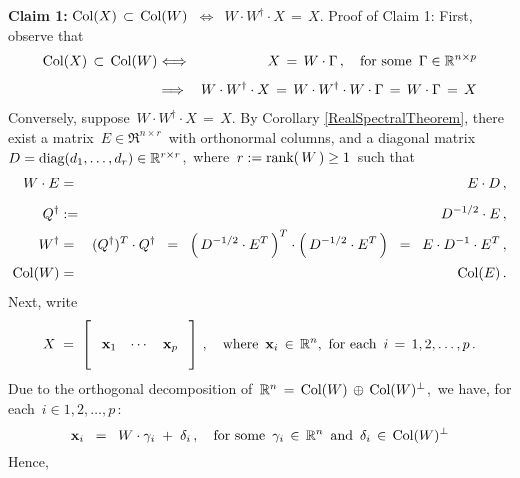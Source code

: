 \begin{enumerate}
	\vskip 0.5cm
	\noindent
	\textbf{Claim 1:}\quad
	$\Col(X) \,\subset\, \Col(W)$
	\,\;$\Longleftrightarrow$\,\; $W \cdot W^{\dagger} \cdot X \,=\,X$.
	\vskip 0.0cm
	\noindent
	Proof of Claim 1:\quad
	First, observe that
	\begin{eqnarray*}
	\Col(X) \,\subset\, \Col(W)
	&\Longleftrightarrow&
		X \,=\, W \cdot \Gamma\,,
		\quad\textnormal{for some \,$\Gamma\in\Re^{n \times p}$}
	\\
	&\overset{{\color{white}\vert}}{\Longrightarrow}&
		W \cdot W^{\dagger} \cdot X
		\,=\, W \cdot W^{\dagger} \cdot W \cdot \Gamma
		\,=\, W \cdot \Gamma
		\,=\, X
	\end{eqnarray*}
	Conversely, suppose \,$W \cdot W^{\dagger} \cdot X \,=\, X$.
	By Corollary \ref{RealSpectralTheorem}, there exist
	a matrix \,$E \in \Re^{n \times r}$\, with orthonormal columns,
	and a diagonal matrix \,$D = \diag(d_{1},\ldots,d_{r}) \in \Re^{r \times r}$,\,
	where \,$r := \rank(\,W\,) \geq 1$\, such that
	\begin{eqnarray*}
	W \cdot E & = & E \cdot D\,,
	\\
	Q^{\dagger} & \overset{{\color{white}\textnormal{\large$-$}}}{:=} & D^{-1/2} \cdot E\,,
	\\
	W^{\dagger} & = & (Q^{\dagger})^{T} \cdot Q^{\dagger}
		\;\; = \;\;
			\left(\,D^{-1/2}\cdot E^{T}\,\right)^{T} \cdot \left(\,D^{-1/2} \cdot E^{T}\,\right)
		\;\; = \;\;
			E \cdot D^{-1} \cdot E^{T}\,,
	\\
	\Col(W) &=& \Col(E)\,.
	\end{eqnarray*}
	Next, write
	\begin{equation*}
	X \;=\; \left[\;
		\begin{array}{ccc}
		\\
		\mathbf{x}_{1} & \cdots & \mathbf{x}_{p}
		\\
		\\
		\end{array}
		\;\right]\,,
	\quad\textnormal{where \,$\mathbf{x}_{i} \,\in\, \Re^{n}$,\, for each \,$i \,=\, 1,2,\ldots,p$}\,.
	\end{equation*}
	Due to the orthogonal decomposition of \,$\Re^{n} \,=\, \Col(W) \,\oplus\, \Col(W)^{\perp}$,\,
	we have, for each \,$i \in 1,2,\ldots,p$\,:
	\begin{equation*}
	\mathbf{x}_{i}
	\;\; = \;\;
		W \cdot \gamma_{i} \;+\; \delta_{i}\,,
	\quad
	\textnormal{for some \,$\gamma_{i} \,\in\, \Re^{n}$\, and \,$\delta_{i} \,\in\, \Col(W)^{\perp}$}
	\end{equation*}
	Hence,
	\begin{equation*}

\end{equation*}
\end{enumerate}

